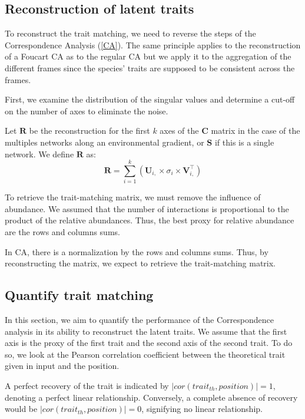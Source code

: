 \subsection{Reconstruction of latent traits}

To reconstruct the trait matching, we need to reverse the steps of the Correspondence Analysis (\ref{CA}). The same principle applies to the reconstruction of a Foucart CA as to the regular CA but we apply it to the aggregation of the different frames since the species' traits are supposed to be consistent across the frames.

First, we examine the distribution of the singular values and determine a cut-off on the number of axes to eliminate the noise.

Let $\mathbf{R}$ be the reconstruction for the first $k$ axes of the $\mathbf{C}$ matrix in the case of the multiples networks along an environmental gradient, or $\mathbf{S}$ if this is a single network. We define $\mathbf{R}$ as:
$$
    \mathbf{R} = \sum_{i=1} ^{k}\left( \mathbf{U}_{i,} \times \sigma_i \times \mathbf{V}_{i,}^\intercal \right)
$$

To retrieve the trait-matching matrix, we must remove the influence of abundance. We assumed that the number of interactions is proportional to the product of the relative abundances.  Thus, the best proxy for relative abundance are the rows and columns sums.

In CA, there is a normalization by the rows and columns sums. Thus, by reconstructing the matrix, we expect to retrieve the trait-matching matrix.

\subsection{Quantify trait matching}

In this section, we aim to quantify the performance of the Correspondence analysis in its ability to reconstruct the latent traits. We assume that the first axis is the proxy of the first trait and the second axis of the second trait. To do so, we look at the Pearson correlation coefficient between the theoretical trait given in input and the position. 

A perfect recovery of the trait is indicated by $\lvert cor(trait_{th}, position)\rvert = 1$, denoting a perfect linear relationship. Conversely, a complete absence of recovery would be $\lvert cor(trait_{th}, position)\rvert = 0$, signifying no linear relationship. 


